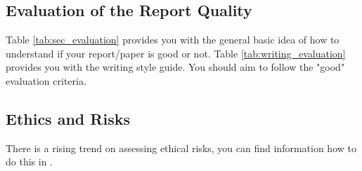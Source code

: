 \documentclass[10pt,conference,compsocconf]{IEEEtran}
\begin{document}
\appendix
\subsection{Evaluation of the Report Quality}\label{sec:evaluation}
Table \ref{tab:sec_evaluation} provides you with the general basic idea of how to understand if your report/paper is good or not. Table \ref{tab:writing_evaluation} provides you with the writing style guide. You should aim to follow the "good" evaluation criteria.

\subsection{Ethics and Risks}\label{sec:ethics}
There is a rising trend on assessing ethical risks, you can find information how to do this in \cite{hardebolle2023digital}.
\end{document}
